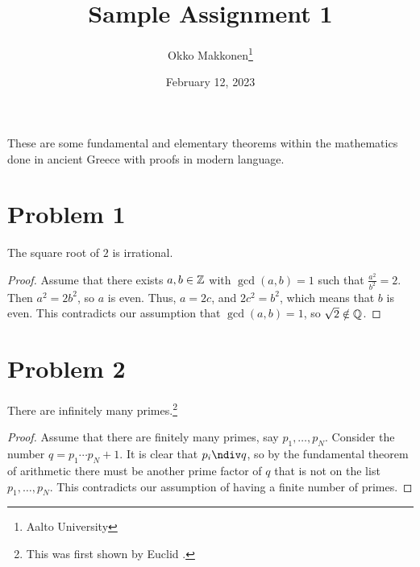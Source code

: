\documentclass{myassignment}
\title{Sample Assignment 1}
\author{Okko Makkonen\thanks{Aalto University}}
\date{February 12, 2023}
\begin{document}
\maketitle

These are some fundamental and elementary theorems within the mathematics done in ancient Greece with proofs in modern language.
    
\section{Problem 1}

\begin{claim}
The square root of $2$ is irrational.
\end{claim}

\begin{proof}
Assume that there exists $a, b \in \mathbb{Z}$ with $\gcd(a, b) = 1$ such that $\frac{a^2}{b^2} = 2$. Then $a^2 = 2b^2$, so $a$ is even. Thus, $a = 2c$, and $2c^2 = b^2$, which means that $b$ is even. This contradicts our assumption that $\gcd(a, b) = 1$, so $\sqrt{2} \notin \mathbb{Q}$.
\end{proof}

\section{Problem 2}

\begin{claim}
There are infinitely many primes.\footnote{This was first shown by Euclid \cite{euclid400BCE}.}
\end{claim}

\begin{proof}
Assume that there are finitely many primes, say $p_1, \dots, p_N$. Consider the number $q = p_1 \cdots p_N + 1$. It is clear that $p_i \ndiv q$, so by the fundamental theorem of arithmetic there must be another prime factor of $q$ that is not on the list $p_1, \dots, p_N$. This contradicts our assumption of having a finite number of primes.
\end{proof}



\end{document}
